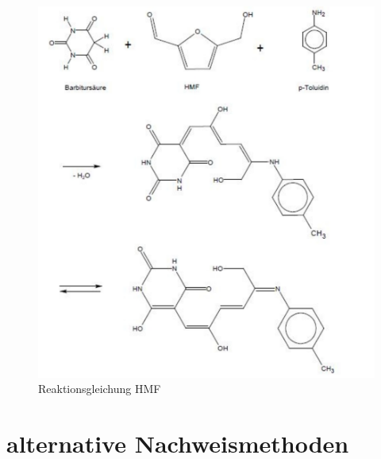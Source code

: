 \begin{figure}[htbp]
	\centering
		\includegraphics[width=1.00\textwidth]{../Bilder/Farbreaktionsgleichung2.pdf}
	\caption{Reaktionsgleichung HMF}
	\label{fig:Farbreaktionsgleichung2}
\end{figure}

\section{alternative Nachweismethoden}

